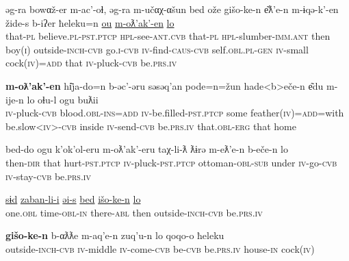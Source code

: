 \documentclass[output=paper]{LSP/langsci}
\begin{document}
\ea

\gll əg-ra bowαž-er m-ac’-oɬ, əg-ra m-učαχ-αšun bed ože gišo-ke-n e͂ƛ’e-n m-ɨqə-k’-en žide-s b-iʔer ħeleku=n \underline{ou} \underline{m-oƛ'ak’-en} \underline{lo} \\
that-\textsc{pl} believe.\textsc{pl-pst.ptcp} \textsc{hpl}-see-\textsc{ant.cvb} that-\textsc{pl} \textsc{hpl}-slumber-\textsc{imm.ant} then boy(\textsc{i}) outside-\textsc{inch-cvb} go.\textsc{i}-\textsc{cvb} \textsc{iv}-find-\textsc{caus-cvb} self.\textsc{obl.pl-gen} \textsc{iv}-small cock(\textsc{iv})=\textsc{add} that \textsc{iv}-pluck-\textsc{cvb} be.\textsc{prs.iv}\\
\glt {}
\z

\ea

\gll \textbf{m-oƛ'ak’-en} hi͂ja-do=n b-əc’-əru səsəq’an pode=n=žun hade<b>eče-n e͂du m-ije-n lo oɬu-l ogu buƛii \\
\textsc{iv}-pluck-\textsc{cvb} blood.\textsc{obl-ins=add} \textsc{iv}-be.filled-\textsc{pst.ptcp} some feather(\textsc{iv)=add}=with be.slow<\textsc{iv}>-\textsc{cvb} inside \textsc{iv}-send-\textsc{cvb} be.\textsc{prs.iv}  that.\textsc{obl-erg} that home\\
\glt {}
\z

\ea

\gll bed-do ogu k’ok’ol-eru m-oƛ’ak’-eru taχ-li-ƛ ƛɨrə m-eƛ’e-n b-eče-n lo\\
then-\textsc{dir} that hurt-\textsc{pst.ptcp} \textsc{iv}-pluck-\textsc{pst.ptcp} ottoman-\textsc{obl-sub} under \textsc{iv}-go-\textsc{cvb} \textsc{iv}-stay-\textsc{cvb} be.\textsc{prs.iv}\\
\glt {}
\z

\ea

\gll \underline{sɨd} \underline{zaban-li-i} \underline{əi-s} \underline{bed} \underline{išo-ke-n} \underline{lo}\\
one.\textsc{obl} time-\textsc{obl-in} there-\textsc{abl} then outside-\textsc{inch-cvb} be.\textsc{prs.iv}\\
\glt {}
\z

\ea

\gll \textbf{gišo-ke-n} b-αƛƛe m-aq’e-n zuq’u-n lo qoqo-o ħeleku\\
outside-\textsc{inch-cvb} \textsc{iv}-middle \textsc{iv}-come-\textsc{cvb} be-\textsc{cvb} be.\textsc{prs.iv} house-\textsc{in} cock(\textsc{iv})\\
\glt {}
\z
\end{document}
